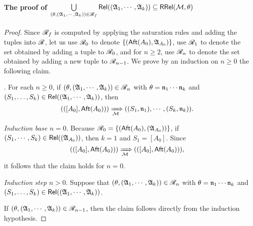 \paragraph*{The proof of $\bigcup \limits_{(\theta, ({\mathfrak{A} }_1, \cdots, {\mathfrak{A} }_k)) \in \mathscr{R}_f}  \mathsf{Rel}(({\mathfrak{A} }_1, \cdots, {\mathfrak{A} }_k)) \subseteq \mathsf{RRel}({\mathcal{M} }, \theta)$}


\begin{proof}
Since $\mathscr{R}_f$ is computed by applying the saturation rules and adding the tuples into $\mathscr{R}$,  let us use $\mathscr{R}_0$ to denote $\{({\sf Aft}(A_0), {\mathfrak{A} }_{A_0})\}$, use $\mathscr{R}_1$ to denote the set obtained by adding a tuple to $\mathscr{R}_0$, and for $n \ge 2$, use $\mathscr{R}_n$ to denote the set obtained by adding a new tuple to $\mathscr{R}_{n-1}$. 
We prove by an induction on $n \ge 0$ the following claim.  

\smallskip
{}. For each $n \ge 0$, if $(\theta, ({\mathfrak{A} }_1, \cdots, {\mathfrak{A} }_k)) \in \mathscr{R}_n$ with $\theta = \mathfrak{n}_1 \cdots \mathfrak{n}_k$ and $(S_1,\dots,S_k) \in \mathsf{Rel}(({\mathfrak{A} }_1, \cdots, {\mathfrak{A} }_k))$, then 
%
$$(([A_0], {\sf Aft}(A_0))) \xRightarrow[{\mathcal{M} }]{} ((S_1, \mathfrak{n}_1), \cdots, (S_k, \mathfrak{n}_k)).$$

\smallskip



\noindent \emph{Induction base $n = 0$}. 
Because $\mathscr{R}_0 = \{({\sf Aft}(A_0),({\mathfrak{A} }_{A_0}))\}$, if $(S_1, \cdots, S_k) \in \mathsf{Rel}(({\mathfrak{A} }_{A_0}))$, then $k=1$ and $S_1 = [A_0]$. Since 
$$(([A_0], {\sf Aft}(A_0))) \xRightarrow[{\mathcal{M} }]{} (([A_0], {\sf Aft}(A_0))),$$ 
%
it follows that the claim holds for $n = 0$. 

\smallskip

\noindent \emph{Induction step $n > 0$}. 
Suppose that $(\theta, ({\mathfrak{A} }_1, \cdots, {\mathfrak{A} }_k)) \in \mathscr{R}_n$ with $\theta = \mathfrak{n}_1 \cdots \mathfrak{n}_k$ and $(S_1,\dots,S_k) \in \mathsf{Rel}(({\mathfrak{A} }_1, \cdots, {\mathfrak{A} }_k))$. 

If $(\theta, ({\mathfrak{A} }_1, \cdots, {\mathfrak{A} }_k)) \in \mathscr{R}_{n-1}$, then the claim follows directly from the induction hypothesis. 


\end{proof}
